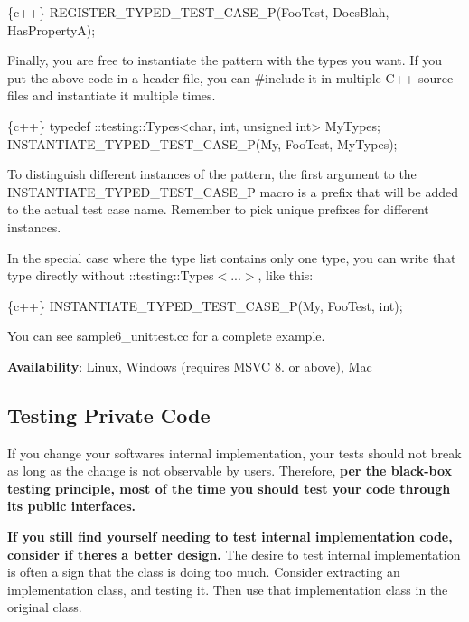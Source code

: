 \begin{DoxyCode}
\{c++\}
REGISTER\_TYPED\_TEST\_CASE\_P(FooTest,
                           DoesBlah, HasPropertyA);
\end{DoxyCode}


Finally, you are free to instantiate the pattern with the types you want. If you put the above code in a header file, you can {\ttfamily \#include} it in multiple C++ source files and instantiate it multiple times.


\begin{DoxyCode}
\{c++\}
typedef ::testing::Types<char, int, unsigned int> MyTypes;
INSTANTIATE\_TYPED\_TEST\_CASE\_P(My, FooTest, MyTypes);
\end{DoxyCode}


To distinguish different instances of the pattern, the first argument to the {\ttfamily I\+N\+S\+T\+A\+N\+T\+I\+A\+T\+E\+\_\+\+T\+Y\+P\+E\+D\+\_\+\+T\+E\+S\+T\+\_\+\+C\+A\+S\+E\+\_\+P} macro is a prefix that will be added to the actual test case name. Remember to pick unique prefixes for different instances.

In the special case where the type list contains only one type, you can write that type directly without {\ttfamily \+::testing\+::\+Types$<$...$>$}, like this\+:


\begin{DoxyCode}
\{c++\}
INSTANTIATE\_TYPED\_TEST\_CASE\_P(My, FooTest, int);
\end{DoxyCode}


You can see {\ttfamily sample6\+\_\+unittest.\+cc} for a complete example.

{\bfseries Availability}\+: Linux, Windows (requires M\+S\+VC 8. or above), Mac

\subsection*{Testing Private Code}

If you change your software\textquotesingle{}s internal implementation, your tests should not break as long as the change is not observable by users. Therefore, {\bfseries per the black-\/box testing principle, most of the time you should test your code through its public interfaces.}

{\bfseries If you still find yourself needing to test internal implementation code, consider if there\textquotesingle{}s a better design.} The desire to test internal implementation is often a sign that the class is doing too much. Consider extracting an implementation class, and testing it. Then use that implementation class in the original class.

